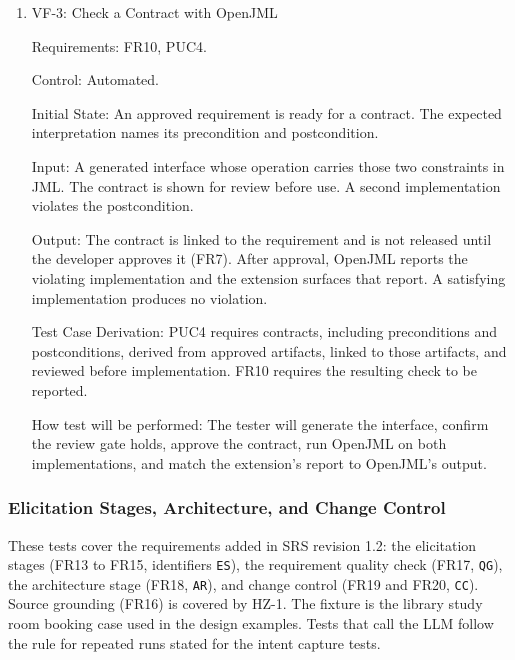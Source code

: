 \documentclass[12pt, titlepage]{article}
\begin{document}
\begin{enumerate}
How test will be performed: The tester will derive the interface, compare its
clauses and trace links with the expected interpretation, and run
\texttt{javac} and OpenJML on it.

\item{VF-3: Check a Contract with OpenJML\\}

Requirements: FR10, PUC4.

Control: Automated.

Initial State: An approved requirement is ready for a contract. The
expected interpretation names its precondition and postcondition.

Input: A generated interface whose operation carries those two constraints
in JML. The contract is shown for review before use. A second
implementation violates the postcondition.

Output: The contract is linked to the requirement and is not released
until the developer approves it (FR7). After approval, OpenJML reports
the violating implementation and the extension surfaces that report. A
satisfying implementation produces no violation.

Test Case Derivation: PUC4 requires contracts, including preconditions and
postconditions, derived from approved artifacts, linked to those artifacts,
and reviewed before implementation. FR10 requires the resulting check to be
reported.

How test will be performed: The tester will generate the interface, confirm
the review gate holds, approve the contract, run OpenJML on both
implementations, and match the extension's report to OpenJML's output.

\end{enumerate}

\subsubsection{Elicitation Stages, Architecture, and Change Control}

These tests cover the requirements added in SRS revision 1.2: the elicitation
stages (FR13 to FR15, identifiers \texttt{ES}), the requirement quality check
(FR17, \texttt{QG}), the architecture stage (FR18, \texttt{AR}), and change
control (FR19 and FR20, \texttt{CC}). Source grounding (FR16) is covered by
HZ-1. The fixture is the library study room booking case used in the design
examples. Tests that call the LLM follow the rule for repeated runs stated for
the intent capture tests.
\end{document}
